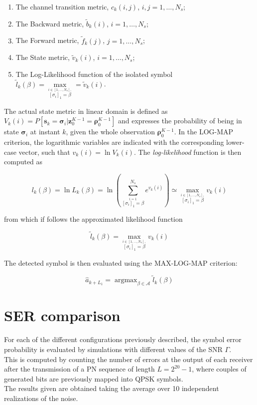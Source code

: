 \documentclass[a4paper, 12pt]{report}
\DeclareMathOperator*{\argmax}{argmax}
\begin{document}
\begin{enumerate}
	\item The channel transition metric, $c_k(i,j)$, $i,j=1,\dots,N_s$;
	\item The Backward metric, $\tilde{b}_k(i)$, $i=1,\dots,N_s$;
	\item The Forward metric, $\tilde{f}_k(j)$, $j=1,\dots,N_s$;
	\item The State metric, $\tilde{v}_k(i)$, $i=1,\dots,N_s$;
	\item The Log-Likelihood function of the isolated symbol $\tilde{l}_k(\beta)= \max\limits_{\overset{i\in[1,\dots,N_s],} {[\sigma_i]_1=\beta}}=\tilde{v}_k(i)$.
\end{enumerate}

The actual state metric in linear domain is defined as $V_k(i) = P[\mathbf{s}_k=\mathbf{\sigma}_i|\mathbf{z}^{K-1}_0=\mathbf{\rho}^{K-1}_0]$ and expresses the probability of being in state $\mathbf{\sigma}_i$ at instant $k$, given the whole observation $\mathbf{\rho}^{K-1}_0$. In the LOG-MAP criterion, the logarithmic variables are indicated with the corresponding lower-case vector, such that $v_k(i)=\ln V_k(i)$. The \textit{log-likelihood} function is then computed as

\begin{equation}
l_k(\beta) = \ln L_k(\beta) = \ln\left(\sum_{\overset{i=1}{[\sigma_i]_1=\beta}}^{N_s}e^{v_k(i)}\right)\simeq \max\limits_{\overset{i\in[1,\dots,N_s],} {[\sigma_i]_1=\beta}}v_k(i)
\end{equation}

from which if follows the approximated likelihood function

\begin{equation}
\tilde{l}_k(\beta) = \max\limits_{\overset{i\in[1,\dots,N_s],} {[\sigma_i]_1=\beta}}v_k(i)
\end{equation}

The detected symbol is then evaluated using the MAX-LOG-MAP criterion:

\begin{equation}
\hat{a}_{k+L_1} = \argmax_{\beta \in \mathcal{A}} \tilde{l}_k(\beta)
\end{equation}

\clearpage
\section*{SER comparison}
For each of the different configurations previously described, the symbol error probability is evaluated by simulations with different values of the SNR $\Gamma$.\\
This is computed by counting the number of errors at the output of each receiver after the transmission of a PN sequence of length $L = 2^{20}-1$, where couples of generated bits are previously mapped into QPSK symbols. \\ 
The results given are obtained taking the average over 10 independent realizations of the noise.
\end{document}
